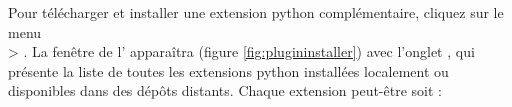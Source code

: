 Pour télécharger et installer une extension python complémentaire, cliquez sur le menu\\  > .
La fenêtre de l' apparaîtra (figure \ref{fig:plugininstaller}) avec l'onglet , qui présente la liste de toutes les extensions python installées localement ou disponibles dans des dépôts distants. Chaque extension peut-être soit :

